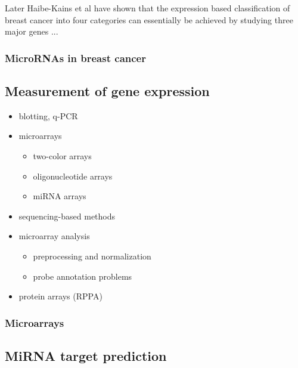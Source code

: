 Later Haibe-Kains et al have shown that the expression based classification of
breast cancer into four categories can essentially be achieved by studying
three major genes \citep{T16} ...



\subsubsection{MicroRNAs in breast cancer}








\subsection{Measurement of gene expression}\label{measurement-of-gene-expression}

\begin{itemize}
  \item blotting, q-PCR
  \item microarrays
  \begin{itemize}
    \item two-color arrays
    \item oligonucleotide arrays
    \item miRNA arrays
  \end{itemize}
  \item sequencing-based methods
  \item microarray analysis
  \begin{itemize}
    \item preprocessing and normalization
    \item probe annotation problems
  \end{itemize}
  \item protein arrays (RPPA)
\end{itemize}

\subsubsection{Microarrays}







\subsection{MiRNA target prediction}\label{mirna-target-prediction}

